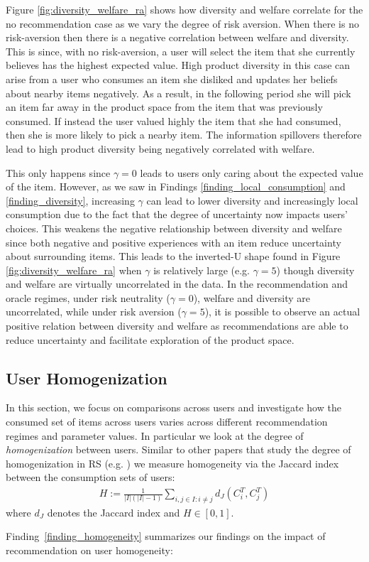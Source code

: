 \documentclass[manuscript]{acmart}
\begin{document}
Figure \ref{fig:diversity_welfare_ra} shows how diversity and welfare correlate for the no recommendation case as we vary the degree of risk aversion. When there is no risk-aversion then there is a negative correlation between welfare and diversity. This is since, with no risk-aversion, a user will select the item that she currently believes has the highest expected value. High product diversity in this case can arise from a user who consumes an item she disliked and updates her beliefs about nearby items negatively. As a result, in the following period she will pick an item far away in the product space from the item that was previously consumed. If instead the user valued highly the item that she had consumed, then she is more likely to pick a nearby item. The information spillovers therefore lead to high product diversity being negatively correlated with welfare.
\par
This only happens since $\gamma = 0$ leads to users only caring about the expected value of the item. However, as we saw in Findings \ref{finding_local_consumption} and \ref{finding_diversity}, increasing $\gamma$ can lead to lower diversity and increasingly local consumption due to the fact that the degree of uncertainty now impacts users' choices. This weakens the negative relationship between diversity and welfare since both negative and positive experiences with an item reduce uncertainty about surrounding items. This leads to the inverted-U shape found in Figure \ref{fig:diversity_welfare_ra} when $\gamma$ is relatively large (e.g. $\gamma = 5$) though diversity and welfare are virtually uncorrelated in the data. In the recommendation and oracle regimes, under risk neutrality ($\gamma=0$), welfare and diversity are uncorrelated, while under risk aversion ($\gamma=5$), it is possible to observe an actual positive relation between diversity and welfare as recommendations are able to reduce uncertainty and facilitate exploration of the product space.

\subsection{User Homogenization}


In this section, we focus on comparisons across users and investigate how the consumed set of items across users varies across different recommendation regimes and parameter values. In particular we look at the degree of \textit{homogenization} between users. Similar to other papers that study the degree of homogenization in RS (e.g. \cite{chaney2018algorithmic}) we measure homogeneity via the Jaccard index between the consumption sets of users:
\begin{align*}
H:=\frac{1}{|I|(|I|-1)}\sum_{i,j \in I: i \ne j}d_J(C_i^T,C_j^T)
\end{align*}
where $d_J$ denotes the Jaccard index and $H \in [0,1]$.
\par
\noindent Finding~\ref{finding_homogeneity} summarizes our findings on the impact of recommendation on user homogeneity:
\end{document}
